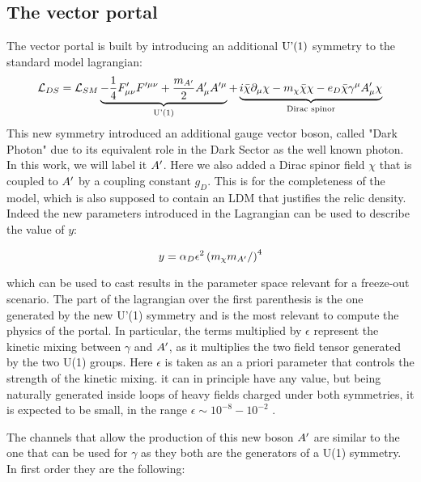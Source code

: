 \subsection{The vector portal}
\label{ch1:sec:dm-colliders}

The vector portal is built by introducing an additional $\textrm{U'(1)}$ symmetry to the standard model lagrangian:
\begin{equation}
  \label{eq:dm-lagrangian}
  \mathcal{L}_{DS} = \mathcal{L}_{SM} \underbrace{- \frac{1}{4}F'_{\mu \nu}F'^{\mu \nu} + \frac{m_{A'}}{2}A'_{\mu}A'^{\mu}}_{\textrm{U'(1)}} + \underbrace{i \bar{\chi} \partial_{\mu} \chi - m_{\chi}\bar{\chi}\chi - e_D \bar{\chi}\gamma^{\mu}A'_{\mu}\chi}_{\textrm{Dirac spinor}}
\end{equation}
This new symmetry introduced an additional gauge vector boson, called "Dark Photon" due to its equivalent role in the Dark Sector as the well known photon. In this work, we will label it $A'$. Here we also added a Dirac spinor field $\chi$ that is coupled to $A'$ by a coupling constant $g_D$. This is for the completeness of the model, which is also supposed to contain an LDM that justifies the relic density. Indeed the new parameters introduced in the Lagrangian can be used to describe the value of $y$:

    \begin{equation}
      \label{eq:dmplane-y-dp}
      y = \alpha_D \epsilon^2 \left(m_{\chi}m_{A'} / \right)^4 
    \end{equation}

which can be used to cast results in the parameter space relevant for a freeze-out scenario.
The part of the lagrangian over the first parenthesis is the one generated by the new U'(1) symmetry and is the most relevant to compute the physics of the portal. In particular, the terms multiplied by $\epsilon$ represent the kinetic mixing between $\gamma$ and $A'$, as it multiplies the two field tensor generated by the two U(1) groups. Here $\epsilon$ is taken as an a priori parameter that controls the strength of the kinetic mixing. it can in principle have any value, but being naturally generated inside loops of heavy fields charged under both symmetries, it is expected to be small, in the range $\epsilon \sim 10^{-8} - 10^{-2}$ \cite{jdb}. 

The channels that allow the production of this new boson $A'$ are similar to the one that can be used for $\gamma$ as they both are the generators of a U(1) symmetry. In first order they are the following:

